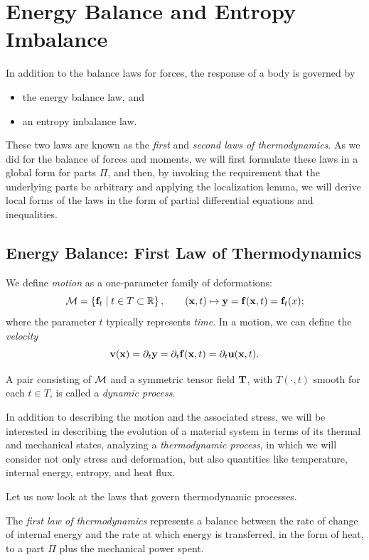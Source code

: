 \chapter{Energy Balance and Entropy Imbalance}

In addition to the balance laws for forces, the response of a body is governed by  
\begin{itemize}
	\item[(i)] the energy balance law, and  
	\item[(ii)] an entropy imbalance law.
\end{itemize}

These two laws are known as the \textit{first} and \textit{second laws of thermodynamics}. As we did for the balance of forces and moments, we will first formulate these laws in a global form for parts \( \Pi \), and then, by invoking the requirement that the underlying parts be arbitrary and applying the localization lemma, we will derive local forms of the laws in the form of partial differential equations and inequalities.



\section{Energy Balance: First Law of Thermodynamics}
We define \textit{motion} as a one-parameter family of deformations:
\[
\mathcal{M} = \left\{ \mathbf{f}_t \mid t \in T \subset \mathbb{R} \right\}, \qquad 	(\mathbf{x}, t) \mapsto \mathbf{y} = \mathbf{f}(\mathbf{x}, t) = \mathbf{f}_t(x);
\]
where the parameter \( t \) typically represents \textit{time}. In a motion, we can define the \textit{velocity}
\[
\mathbf{v}(\mathbf{x}) = \partial_t \mathbf{y} = \partial_t \mathbf{f}(\mathbf{x}, t)= \partial_t \mathbf{u}(\mathbf{x}, t).
\]

A pair consisting of \( \mathcal{M} \) and a symmetric tensor field \( \mathbf{T} \), with \( T(\cdot, t) \) smooth for each \( t \in T \), is called a \textit{dynamic process}.

In addition to describing the motion and the associated stress, we will be interested in describing the evolution of a material system in terms of its thermal and mechanical states, analyzing a \textit{thermodynamic process}, in which we will consider not only stress and deformation, but also quantities like temperature, internal energy, entropy, and heat flux.

Let us now look at the laws that govern thermodynamic processes.

The \textit{first law of thermodynamics} represents a balance between the rate of change of internal energy and the rate at which energy is transferred, in the form of heat, to a part \( \Pi \) plus the mechanical power spent. %

